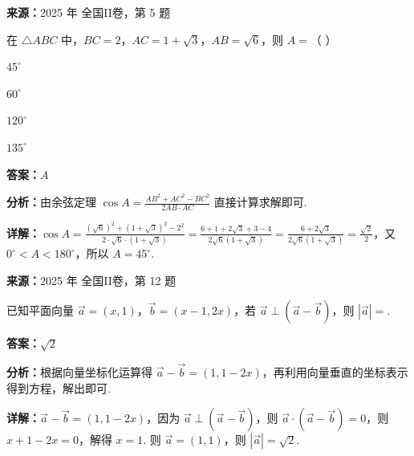 \begin{question}[points=5]
\textbf{来源：}2025 年 全国II卷，第 5 题\par
在 $\triangle ABC$ 中，$BC=2$，$AC=1+\sqrt{3}$，$AB=\sqrt{6}$，则 $A=$（ ）
\begin{choices}
  \item $45^\circ$
  \item $60^\circ$
  \item $120^\circ$
  \item $135^\circ$
\end{choices}
\begin{solution}
\textbf{答案：}$A$

\textbf{分析：}由余弦定理 $\cos A=\frac{AB^2+AC^2-BC^2}{2AB\cdot AC}$ 直接计算求解即可.

\textbf{详解：}$\cos A=\frac{(\sqrt{6})^2+(1+\sqrt{3})^2-2^2}{2\cdot\sqrt{6}\cdot(1+\sqrt{3})}=\frac{6+1+2\sqrt{3}+3-4}{2\sqrt{6}(1+\sqrt{3})}=\frac{6+2\sqrt{3}}{2\sqrt{6}(1+\sqrt{3})}=\frac{\sqrt{2}}{2}$，又 $0^\circ<A<180^\circ$，所以 $A=45^\circ$.
\end{solution}
\end{question}

\begin{question}[points=5]
\textbf{来源：}2025 年 全国II卷，第 12 题\par
已知平面向量 $\vec{a}=(x,1)$，$\vec{b}=(x-1,2x)$，若 $\vec{a}\perp(\vec{a}-\vec{b})$，则 $|\vec{a}|=$.
\fillin[{$\sqrt{2}$}]
\begin{solution}
\textbf{答案：}$\sqrt{2}$

\textbf{分析：}根据向量坐标化运算得 $\vec{a}-\vec{b}=(1,1-2x)$，再利用向量垂直的坐标表示得到方程，解出即可.

\textbf{详解：}$\vec{a}-\vec{b}=(1,1-2x)$，因为 $\vec{a}\perp(\vec{a}-\vec{b})$，则 $\vec{a}\cdot(\vec{a}-\vec{b})=0$，则 $x+1-2x=0$，解得 $x=1$. 则 $\vec{a}=(1,1)$，则 $|\vec{a}|=\sqrt{2}$.
\end{solution}
\end{question}

